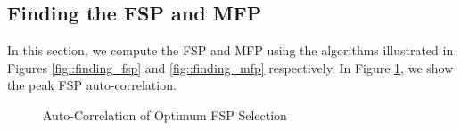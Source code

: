 \documentclass[conference,onecolumn]{IEEEtran}
\begin{document}



\subsection{Finding the FSP and MFP}

In this section, we compute the FSP and MFP using the algorithms illustrated in Figures \ref{fig::finding_fsp} and \ref{fig::finding_mfp} respectively. In Figure \ref{fig::fsp_correlation}, we show the peak FSP auto-correlation.

\begin{figure}[H]
	\centerline{}
	\caption{Auto-Correlation of Optimum FSP Selection}
	\label{fig::fsp_correlation}
\end{figure}
\end{document}
